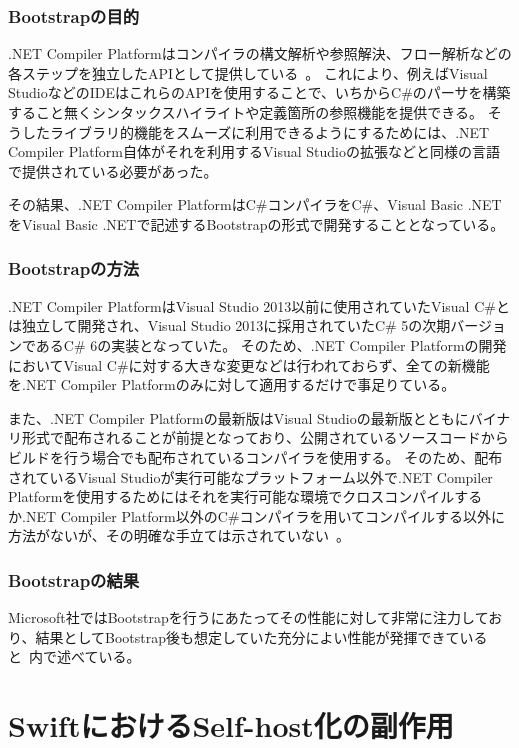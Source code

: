 \subsubsection{Bootstrapの目的}

.NET Compiler Platformはコンパイラの構文解析や参照解決、フロー解析などの各ステップを独立したAPIとして提供している~\cite{roslyn-doc}。
これにより、例えばVisual StudioなどのIDEはこれらのAPIを使用することで、いちからC\#のパーサを構築すること無くシンタックスハイライトや定義箇所の参照機能を提供できる。
そうしたライブラリ的機能をスムーズに利用できるようにするためには、.NET Compiler Platform自体がそれを利用するVisual Studioの拡張などと同様の言語で提供されている必要があった。

その結果、.NET Compiler PlatformはC\#コンパイラをC\#、Visual Basic .NETをVisual Basic .NETで記述するBootstrapの形式で開発することとなっている。

\subsubsection{Bootstrapの方法}

.NET Compiler PlatformはVisual Studio 2013以前に使用されていたVisual C\#とは独立して開発され、Visual Studio 2013に採用されていたC\# 5の次期バージョンであるC\# 6の実装となっていた。
そのため、.NET Compiler Platformの開発においてVisual C\#に対する大きな変更などは行われておらず、全ての新機能を.NET Compiler Platformのみに対して適用するだけで事足りている。

また、.NET Compiler Platformの最新版はVisual Studioの最新版とともにバイナリ形式で配布されることが前提となっており、公開されているソースコードからビルドを行う場合でも配布されているコンパイラを使用する。
そのため、配布されているVisual Studioが実行可能なプラットフォーム以外で.NET Compiler Platformを使用するためにはそれを実行可能な環境でクロスコンパイルするか.NET Compiler Platform以外のC\#コンパイラを用いてコンパイルする以外に方法がないが、その明確な手立ては示されていない~\cite{roslyn-cross-platform}。

\subsubsection{Bootstrapの結果}

Microsoft社ではBootstrapを行うにあたってその性能に対して非常に注力しており、結果としてBootstrap後も想定していた充分によい性能が発揮できていると~\cite{roslyn-performance}内で述べている。


\section{SwiftにおけるSelf-host化の副作用}
\label{side-effect:swift}

